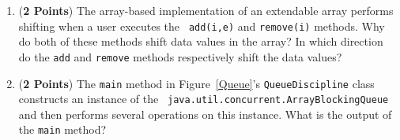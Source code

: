 \documentclass[12pt]{article}
\begin{document}
\begin{enumerate}
\begin{enumerate}
  \item ({\bf 2 Points}) The array-based implementation of an
    extendable array performs shifting when a user executes the {\tt
      add(i,e)} and {\tt remove(i)} methods.  Why do both of these
    methods shift data values in the array?  In which direction do the
    {\tt add} and {\tt remove} methods respectively shift the data
    values?

  \item ({\bf 2 Points}) The {\tt main} method in Figure~\ref{Queue}'s
    {\tt QueueDiscipline} class constructs an instance of the {\tt
      java.util.concurrent.ArrayBlockingQueue} and then performs
    several operations on this instance.  What is the output of the
    {\tt main} method?



  \end{enumerate}





\end{enumerate}
\end{document}
